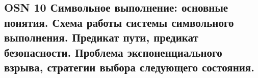 \subsection{OSN 10 Символьное выполнение: основные понятия. Схема работы системы символьного выполнения. Предикат пути, предикат безопасности. Проблема
экспоненциального взрыва, стратегии выбора следующего состояния.}
